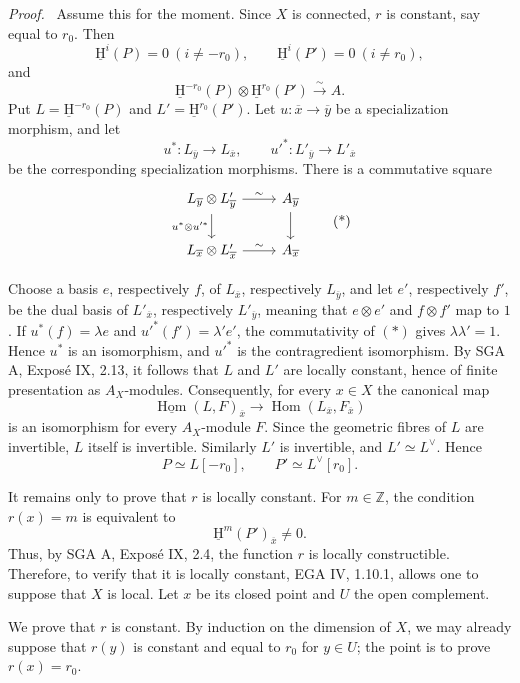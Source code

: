 \documentclass[11pt]{article}
\providecommand{\uH}{\underline{\mathrm H}}
\providecommand{\ZZ}{\mathbb{Z}}
\newenvironment{prooftext}[1][Proof]{\par\noindent\emph{#1.}\ }{\par\medskip}
\DeclareMathOperator{\Hom}{Hom}
\newcommand{\ol}[1]{\overline{#1}}
\providecommand{\Hom}{\operatorname{Hom}}
\providecommand{\Hom}{\operatorname{Hom}}
\begin{document}
\begin{prooftext}
Assume this for the moment. Since $X$ is connected, $r$ is constant, say equal to $r_0$. Then
\[
   \uH^i(P)=0\ (i\ne-r_0),\qquad \uH^i(P')=0\ (i\ne r_0),
\]
and
\[
   \uH^{-r_0}(P)\otimes\uH^{r_0}(P')\xrightarrow{\sim}A.
\]
Put $L=\uH^{-r_0}(P)$ and $L'=\uH^{r_0}(P')$. Let $u:\ol{x}\to\ol{y}$ be a specialization morphism, and let
\[
   u^*:L_{\ol{y}}\to L_{\ol{x}},\qquad u'^*:L'_{\ol{y}}\to L'_{\ol{x}}
\]
be the corresponding specialization morphisms. There is a commutative square
\begin{equation}
\begin{tikzcd}
L_{\ol{y}}\otimes L'_{\ol{y}} \arrow[r,"\sim"] \arrow[d,"u^*\otimes u'^*"'] & A_{\ol{y}} \arrow[d] \\
L_{\ol{x}}\otimes L'_{\ol{x}} \arrow[r,"\sim"] & A_{\ol{x}}
\end{tikzcd}
\tag{*}\label{sga5:I:equation:unnumbered:3}
\end{equation}
\par\medskip
Choose a basis $e$, respectively $f$, of $L_{\ol{x}}$, respectively $L_{\ol{y}}$, and let $e'$, respectively $f'$, be the dual basis of $L'_{\ol{x}}$, respectively $L'_{\ol{y}}$, meaning that $e\otimes e'$ and $f\otimes f'$ map to $1$. If $u^*(f)=\lambda e$ and $u'^*(f')=\lambda'e'$, the commutativity of $(*)$ gives $\lambda\lambda'=1$. Hence $u^*$ is an isomorphism, and $u'^*$ is the contragredient isomorphism. By SGA A, Exposé IX, 2.13, it follows that $L$ and $L'$ are locally constant, hence of finite presentation as $A_X$-modules. Consequently, for every $x\in X$ the canonical map
\[
   \underline{\Hom}(L,F)_{\ol{x}}\longrightarrow\Hom(L_{\ol{x}},F_{\ol{x}})
\]
is an isomorphism for every $A_X$-module $F$. Since the geometric fibres of $L$ are invertible, $L$ itself is invertible. Similarly $L'$ is invertible, and $L'\simeq L^\vee$. Hence
\[
   P\simeq L[-r_0],\qquad P'\simeq L^\vee[r_0].
\]

It remains only to prove that $r$ is locally constant. For $m\in\ZZ$, the condition $r(x)=m$ is equivalent to
\[
   \uH^m(P')_{\ol{x}}\ne0.
\]
Thus, by SGA A, Exposé IX, 2.4, the function $r$ is locally constructible. Therefore, to verify that it is locally constant, EGA IV, 1.10.1, allows one to suppose that $X$ is local. Let $x$ be its closed point and $U$ the open complement.

We prove that $r$ is constant. By induction on the dimension of $X$, we may already suppose that $r(y)$ is constant and equal to $r_0$ for $y\in U$; the point is to prove $r(x)=r_0$.


\end{prooftext}
\end{document}
